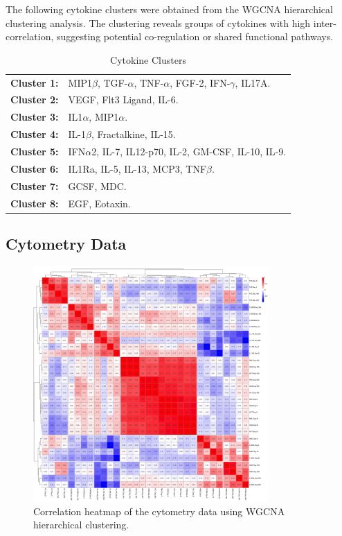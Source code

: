 \documentclass[12pt,a4paper]{report}
\begin{document}
The following cytokine clusters were obtained from the WGCNA hierarchical clustering analysis. The clustering reveals groups of cytokines with high inter-correlation, suggesting potential co-regulation or shared functional pathways.

\begin{table}[h!]
    \centering
    \begin{tabular}{ll}
        \textbf{Cluster 1:} & MIP1$\beta$, TGF-$\alpha$, TNF-$\alpha$, FGF-2, IFN-$\gamma$, IL17A. \\
        \textbf{Cluster 2:} & VEGF, Flt3 Ligand, IL-6. \\
        \textbf{Cluster 3:} & IL1$\alpha$, MIP1$\alpha$. \\
        \textbf{Cluster 4:} & IL-1$\beta$, Fractalkine, IL-15. \\
        \textbf{Cluster 5:} & IFN$\alpha$2, IL-7, IL12-p70, IL-2, GM-CSF, IL-10, IL-9. \\
        \textbf{Cluster 6:} & IL1Ra, IL-5, IL-13, MCP3, TNF$\beta$. \\
        \textbf{Cluster 7:} & GCSF, MDC. \\
        \textbf{Cluster 8:} & EGF, Eotaxin.
    \end{tabular}
    \caption{Cytokine Clusters}
    \label{tab:cytokine_clusters}
\end{table}


\subsection{Cytometry Data}

\begin{figure}[H]
  \centering
  \includegraphics[width=0.8\textwidth]{images/Cytometry_euclidean_distance.png}
  \caption[cytometry data correlations]{Correlation heatmap of the cytometry data using  WGCNA hierarchical clustering.}
  \label{fig:cytometry_heatmap}
\end{figure}
\end{document}
